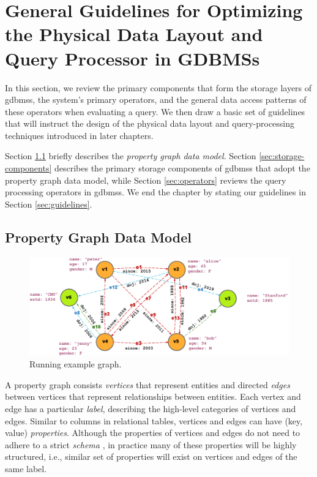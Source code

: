 \chapter{General Guidelines for Optimizing the Physical Data Layout and Query Processor in GDBMSs}
\label{c:guidelines}

In this section, we review the primary components that form the storage layers of \gls{gdbms}s, the system's primary operators, and the general data access patterns of these operators when evaluating a query. We then draw a basic set of guidelines that will instruct the design of the physical data layout and query-processing techniques introduced in later chapters.

Section \ref{sec:property-graph-data-model} briefly describes the \emph{property graph data model}. Section \ref{sec:storage-components} describes the primary storage components of \gls{gdbms}s that adopt the property graph data model, while Section \ref{sec:operators} reviews the query processing operators in \gls{gdbms}s. We end the chapter by stating our guidelines in Section \ref{sec:guidelines}.

\section{Property Graph Data Model}
\label{sec:property-graph-data-model}

\begin{figure}
	\includegraphics[scale=0.86]{img/property-graph}
	\vspace{-8pt}
	\caption{Running example graph.}
	\label{fig:runn}
	\vspace{-8pt}
\end{figure}

A property graph consists \emph{vertices} that represent entities and directed \emph{edges} between vertices that represent relationships between entities. Each vertex and edge has a particular \emph{label}, describing the high-level categories of vertices and edges. Similar to columns in relational tables, vertices and edges can have (key, value) \emph{properties}. Although the properties of vertices and edges do not need to adhere to a strict \emph{schema }, in practice many of these properties will be highly structured, i.e., similar set of properties will exist on vertices and edges of the same label.

